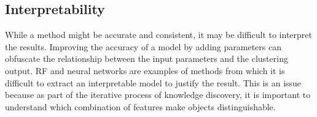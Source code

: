 \subsection{Interpretability}
While a method might be accurate and consistent, it may be difficult to interpret the results.
Improving the accuracy of a model by adding parameters can obfuscate the relationship between the input parameters and the clustering output.
\Acrfull{RF} and neural networks are examples of methods from which it is difficult to extract an interpretable model to justify the result.
This is an issue because
as part of the iterative process of knowledge discovery, it is important to understand which combination of features make objects distinguishable.




